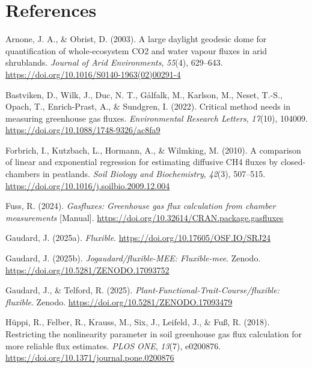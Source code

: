 \documentclass[
  letterpaper,
  DIV=11,
  numbers=noendperiod]{scrartcl}
\newlength{\cslhangindent}
\newenvironment{CSLReferences}[2] %
 {\begin{list}{}{%
  \setlength{\itemindent}{0pt}
  \setlength{\leftmargin}{0pt}
  \setlength{\parsep}{0pt}
  \ifodd #1
   \setlength{\leftmargin}{\cslhangindent}
   \setlength{\itemindent}{-1\cslhangindent}
  \fi
  \setlength{\itemsep}{#2\baselineskip}}}
 {\end{list}}
\begin{document}
\section*{References}\label{references}

\label{refs}
\begin{CSLReferences}{1}{0}
Arnone, J. A., \& Obrist, D. (2003). A large daylight geodesic dome for
quantification of whole-ecosystem {CO2} and water vapour fluxes in arid
shrublands. \emph{Journal of Arid Environments}, \emph{55}(4), 629--643.
\url{https://doi.org/10.1016/S0140-1963(02)00291-4}

Bastviken, D., Wilk, J., Duc, N. T., Gålfalk, M., Karlson, M., Neset,
T.-S., Opach, T., Enrich-Prast, A., \& Sundgren, I. (2022). Critical
method needs in measuring greenhouse gas fluxes. \emph{Environmental
Research Letters}, \emph{17}(10), 104009.
\url{https://doi.org/10.1088/1748-9326/ac8fa9}

Forbrich, I., Kutzbach, L., Hormann, A., \& Wilmking, M. (2010). A
comparison of linear and exponential regression for estimating diffusive
{CH4} fluxes by closed-chambers in peatlands. \emph{Soil Biology and
Biochemistry}, \emph{42}(3), 507--515.
\url{https://doi.org/10.1016/j.soilbio.2009.12.004}

Fuss, R. (2024). \emph{Gasfluxes: {Greenhouse} gas flux calculation from
chamber measurements} {[}Manual{]}.
\url{https://doi.org/10.32614/CRAN.package.gasfluxes}

Gaudard, J. (2025a). \emph{Fluxible}.
\url{https://doi.org/10.17605/OSF.IO/SRJ24}

Gaudard, J. (2025b). \emph{Jogaudard/fluxible-{MEE}: Fluxible-mee}.
Zenodo. \url{https://doi.org/10.5281/ZENODO.17093752}

Gaudard, J., \& Telford, R. (2025).
\emph{Plant-{Functional-Trait-Course}/fluxible: fluxible}. Zenodo.
\url{https://doi.org/10.5281/ZENODO.17093479}

Hüppi, R., Felber, R., Krauss, M., Six, J., Leifeld, J., \& Fuß, R.
(2018). Restricting the nonlinearity parameter in soil greenhouse gas
flux calculation for more reliable flux estimates. \emph{PLOS ONE},
\emph{13}(7), e0200876.
\url{https://doi.org/10.1371/journal.pone.0200876}


\end{CSLReferences}
\end{document}

